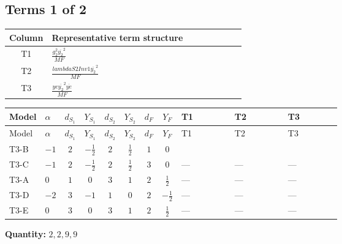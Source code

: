 \documentclass[8pt]{article}
\begin{document}
\begin{landscape}
\subsection*{Terms 1 of 2}
\begin{center}
\begin{tabular}{@{}c >{\raggedright\arraybackslash}p{0.82\linewidth}@{}}
\toprule
Column & Representative term structure \\
\midrule
T1 & \(\displaystyle \frac{g_{2}^{2} \overline{y_{2}}^{2}}{MF}\) \\
\midrule
T2 & \(\displaystyle \frac{lambdaS2Inv1 \overline{y_{2}}^{2}}{MF}\) \\
\midrule
T3 & \(\displaystyle \frac{ye \overline{y_{2}}^{2} \overline{ye}}{MF}\) \\
\midrule
\bottomrule
\end{tabular}
\end{center}
\smallskip
\tiny
\begin{longtable}{@{}llcccccc >{\raggedright\arraybackslash}p{0.21\linewidth} >{\raggedright\arraybackslash}p{0.21\linewidth} >{\raggedright\arraybackslash}p{0.21\linewidth}@{}}
\toprule
Model & $\alpha$ & $d_{S_1}$ & $Y_{S_1}$ & $d_{S_2}$ & $Y_{S_2}$ & $d_F$ & $Y_F$ & T1 & T2 & T3 \\
\midrule
\endfirsthead
\toprule
Model & $\alpha$ & $d_{S_1}$ & $Y_{S_1}$ & $d_{S_2}$ & $Y_{S_2}$ & $d_F$ & $Y_F$ & T1 & T2 & T3 \\
\midrule
\endhead
T3-B & $-1$ & $2$ & $-\frac{1}{2}$ & $2$ & $\frac{1}{2}$ & $1$ & $0$ & \scriptsize\adjustbox{max width=\linewidth}{$\begin{gathered} - \frac{3 g_{2}^{2} \overline{y_{2}}^{2}}{4 MF}\end{gathered}$} & \scriptsize\adjustbox{max width=\linewidth}{$\begin{gathered} - \frac{lambdaS2Inv1 \overline{y_{2}}^{2}}{2 MF}\end{gathered}$} & \scriptsize\adjustbox{max width=\linewidth}{$\begin{gathered} \frac{ye \overline{y_{2}}^{2} \overline{ye}}{4 MF}\end{gathered}$} \\
\midrule
T3-C & $-1$ & $2$ & $-\frac{1}{2}$ & $2$ & $\frac{1}{2}$ & $3$ & $0$ & --- & --- & --- \\
\midrule
T3-A & $0$ & $1$ & $0$ & $3$ & $1$ & $2$ & $\frac{1}{2}$ & --- & --- & --- \\
\midrule
T3-D & $-2$ & $3$ & $-1$ & $1$ & $0$ & $2$ & $-\frac{1}{2}$ & --- & --- & --- \\
\midrule
T3-E & $0$ & $3$ & $0$ & $3$ & $1$ & $2$ & $\frac{1}{2}$ & --- & --- & --- \\
\midrule
\bottomrule
\end{longtable}
\clearpage
\noindent\textbf{Quantity: }$\mathrm{2,2,9,9}$\par\smallskip

\end{landscape}
\end{document}
